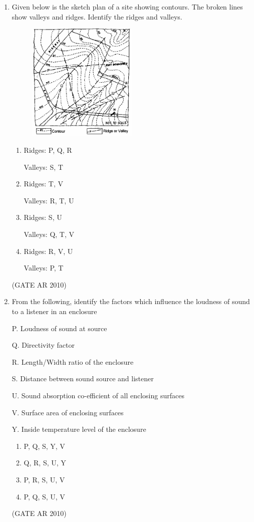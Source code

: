 \documentclass[journal]{IEEEtran}
\begin{document}
\begin{enumerate}
\item Given below is the sketch plan of a site showing contours. The broken lines show valleys and ridges. Identify the ridges and valleys.
\begin{figure}[H]
\centering
\includegraphics[width=0.5\textwidth]{Fig 6.png}
\caption{}
\label{fig:question33}
\end{figure}
\begin{multicols}{2}
\begin{enumerate}
\item Ridges: P, Q, R 

      Valleys: S, T
\item Ridges: T, V 

      Valleys: R, T, U
\item Ridges: S, U 

      Valleys: Q, T, V
\item Ridges: R, V, U 

      Valleys: P, T
\end{enumerate}
\end{multicols}
\hfill (GATE AR 2010)

\item From the following, identify the factors which influence the loudness of sound to a listener in an enclosure

P. Loudness of sound at source

Q. Directivity factor

R. Length/Width ratio of the enclosure

S. Distance between sound source and listener

U. Sound absorption co-efficient of all enclosing surfaces

V. Surface area of enclosing surfaces

Y. Inside temperature level of the enclosure
\begin{multicols}{4}
\begin{enumerate}
\item P, Q, S, Y, V
\item Q, R, S, U, Y
\item P, R, S, U, V
\item P, Q, S, U, V
\end{enumerate}
\end{multicols}
\hfill (GATE AR 2010)


\end{enumerate}
\end{document}
